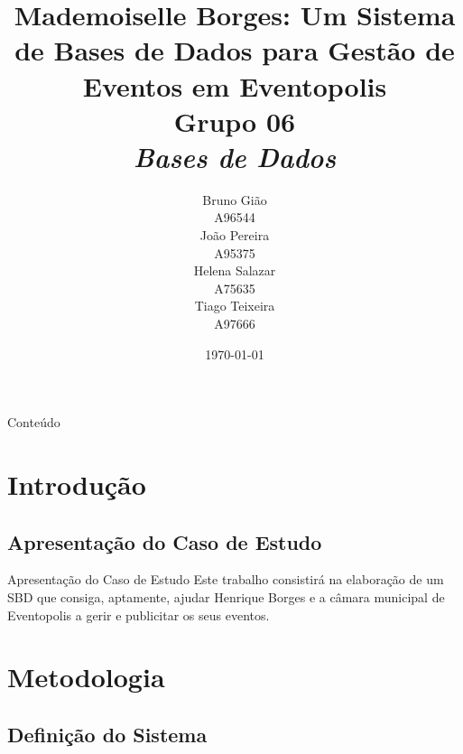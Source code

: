 \documentclass[compress,svgnames,handout,13.7pt]{beamer}
\title[Apresentação Final]
    {\textbf{Mademoiselle Borges: Um Sistema de Bases de Dados para
Gestão de Eventos em Eventopolis\\
    \textbf{Grupo 06} \\
    \textit{Bases de Dados}}
}
\author[G06]{%
  \begin{tabular}{c}
    Bruno Gião \\
    A96544
  \end{tabular}
  \begin{tabular}{c}
    João Pereira \\
    A95375
  \end{tabular}
  \begin{tabular}{c}
    Helena Salazar \\
    A75635
  \end{tabular}
  \begin{tabular}{c}
    Tiago Teixeira \\
    A97666
  \end{tabular}
}
\date{\today}
\begin{document}
\thispagestyle{empty}
\frame{\titlepage}


\begin{frame}{Conteúdo}
\setcounter{secnumdepth}{2}
\setcounter{tocdepth}{2}
\tableofcontents
\end{frame}


\section{Introdução}

\subsection{Apresentação do Caso de Estudo}
\begin{frame}{Apresentação do Caso de Estudo}
Este trabalho consistirá na elaboração de um SBD que consiga, aptamente, ajudar Henrique Borges
e a c\^amara municipal de Eventopolis a gerir e publicitar os seus eventos.
\end{frame}

\section{Metodologia}

\subsection{Definição do Sistema}
\end{document}
